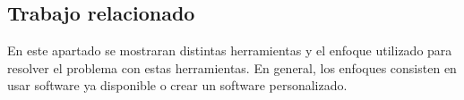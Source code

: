 \documentclass[11pt,letterpaper]{article}
\begin{document}



\subsection{Trabajo relacionado} 

En este apartado se mostraran distintas herramientas y el enfoque utilizado para resolver el problema con estas herramientas. En general, los enfoques consisten en usar software ya disponible o crear un software personalizado.
\end{document}
